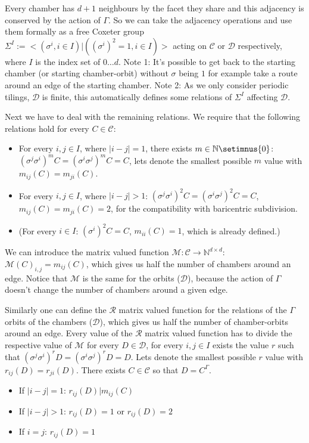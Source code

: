 \documentclass[12pt,a4paper]{article}
\begin{document}
Every chamber has $d+1$ neighbours by the facet they share and this adjacency is
conserved by the action of $\Gamma$. So we can take the adjacency operations and
use them formally as a free Coxeter group $\Sigma^I := <(\sigma^i, i\in I) |
((\sigma^i)^2=1, i\in I)>$ acting on $\mathcal{C}$ or $\mathcal{D}$
respectively, where $I$ is the index set of $0\ldots d$. Note 1: It's possible to
get back to the starting chamber (or starting chamber-orbit) without $\sigma$
being $1$ for example take a route around an edge of the starting chamber. Note
2: As we only consider periodic tilings, $\mathcal{D}$ is finite, this
automatically defines some relations of $\Sigma^I$ affecting $\mathcal{D}$.

Next we have to deal with the remaining relations. We require that the following
relations hold for every $C\in\mathcal{C}$:
\begin{itemize}
  \item For every $i,j\in I$, where $|i-j|=1$, there exists
    $m\in\mathbb{N}\setimnus {0}$:
    $(\sigma^j\sigma^i)^mC=(\sigma^i\sigma^j)^mC=C$, lets denote the smallest
    possible $m$ value with $m_{ij}(C)=m_{ji}(C)$.
  \item For every $i,j\in I$, where $|i-j|>1$:
    $(\sigma^j\sigma^i)^2C=(\sigma^i\sigma^j)^2C=C$, $m_{ij}(C)=m_{ji}(C)=2$, for the compatibility with
    baricentric subdivision.  
  \item (For every $i\in I$: $(\sigma^i)^2C=C$, $m_{ii}(C)=1$, which is already defined.)
\end{itemize}

We can introduce the matrix valued function $\mathcal{M}: \mathcal{C}
\rightarrow \mathbb{N}^{d\times d}$: $\mathcal{M}(C)_{i,j}=m_{ij}(C)$, which
gives us half the number of chambers around an edge. Notice that $\mathcal{M}$
is the same for the orbits ($\mathcal{D}$), because the action of $\Gamma$
doesn't change the number of chambers around a given edge.

Similarly one can define the $\mathcal{R}$ matrix valued function for the
relations of the $\Gamma$ orbits of the chambers ($\mathcal{D}$), which gives us
half the number of chamber-orbits around an edge. Every value of the $\mathcal{R}$
matrix valued function has to divide the respective value of $\mathcal{M}$ for
every $D\in\mathcal{D}$, for every $i,j\in I$ exists the value $r$ such that
$(\sigma^j\sigma^i)^rD=(\sigma^i\sigma^j)^rD=D$. Lets denote the smallest
possible $r$ value with $r_{ij}(D)=r_{ji}(D)$. There exists $C\in\mathcal{C}$ so
that $D=C^\Gamma$.
\begin{itemize}
  \item If $|i-j|=1$: $r_{ij}(D)|m_{ij}(C)$
  \item If $|i-j|>1$: $r_{ij}(D)=1$ or $r_{ij}(D)=2$
  \item If $i=j$: $r_{ij}(D)=1$
\end{itemize}
\end{document}
